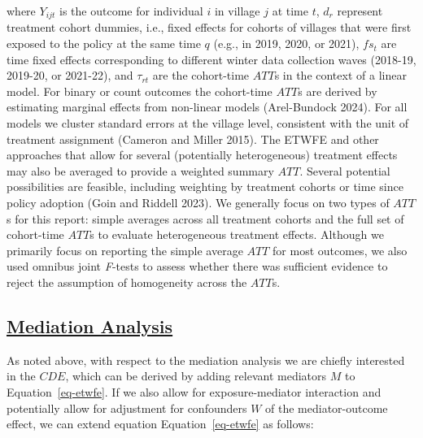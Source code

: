 \documentclass[
  letterpaper,
  DIV=11,
  numbers=noendperiod]{scrartcl}
\providecommand{\DIFadd}[1]{{\protect\color{blue}\underline{#1}}} %
\providecommand{\DIFaddbegin}{} %
\providecommand{\DIFaddend}{} %
\providecommand{\DIFdelbegin}{} %
\providecommand{\DIFdelend}{} %
\newcommand{\DIFscaledelfig}{0.5}
\newlength{\DIFdelgraphicswidth} %
\newlength{\DIFdelgraphicsheight} %
\newcommand{\DIFaddincludegraphics}[2][]{{\color{blue}\fbox{\DIFOincludegraphics[#1]{#2}}}} %
\newcommand{\DIFdelincludegraphics}[2][]{%
\sbox{\DIFdelgraphicsbox}{\DIFOincludegraphics[#1]{#2}}%
\settoboxwidth{\DIFdelgraphicswidth}{\DIFdelgraphicsbox} %
\settoboxtotalheight{\DIFdelgraphicsheight}{\DIFdelgraphicsbox} %
\scalebox{\DIFscaledelfig}{%
\parbox[b]{\DIFdelgraphicswidth}{\usebox{\DIFdelgraphicsbox}\\[-\baselineskip] \rule{\DIFdelgraphicswidth}{0em}}\llap{\resizebox{\DIFdelgraphicswidth}{\DIFdelgraphicsheight}{%
\setlength{\unitlength}{\DIFdelgraphicswidth}%
\begin{picture}(1,1)%
\thicklines\linethickness{2pt} %
{\color[rgb]{1,0,0}\put(0,0){\framebox(1,1){}}}%
{\color[rgb]{1,0,0}\put(0,0){\line( 1,1){1}}}%
{\color[rgb]{1,0,0}\put(0,1){\line(1,-1){1}}}%
\end{picture}%
}\hspace*{3pt}}} %
} %
\DeclareRobustCommand{\DIFaddbegin}{\DIFOaddbegin \let\includegraphics\DIFaddincludegraphics} %
\DeclareRobustCommand{\DIFaddend}{\DIFOaddend \let\includegraphics\DIFOincludegraphics} %
\DeclareRobustCommand{\DIFdelbegin}{\DIFOdelbegin \let\includegraphics\DIFdelincludegraphics} %
\DeclareRobustCommand{\DIFdelend}{\DIFOaddend \let\includegraphics\DIFOincludegraphics} %
\begin{document}
where \(Y_{ijt}\) is the outcome for individual \(i\) in village \(j\)
at time \(t\), \(d_{r}\) represent treatment cohort dummies, i.e., fixed
effects for cohorts of villages that were first exposed to the policy at
the same time \(q\) (e.g., in 2019, 2020, or 2021), \(fs_{t}\) are time
fixed effects corresponding to different winter data collection waves
(2018-19, 2019-20, or 2021-22), and \(\tau_{rt}\) are the cohort-time
\(ATT\)s in the context of a linear model. For binary or count outcomes
the cohort-time \(ATT\)s are derived by estimating marginal effects from
non-linear models (Arel-Bundock 2024). For all models we cluster
standard errors at the village level, consistent with the unit of
treatment assignment (Cameron and Miller 2015). The ETWFE and other
approaches that allow for several (potentially heterogeneous) treatment
effects may also be averaged to provide a weighted summary \(ATT\).
Several potential possibilities are feasible, including weighting by
treatment cohorts or time since policy adoption (Goin and Riddell 2023).
We generally focus on two types of \(ATT\)s for this report: simple
averages across all treatment cohorts and the full set of cohort-time
\(ATT\)s to evaluate heterogeneous treatment effects. Although we
primarily focus on reporting the simple average \(ATT\) for most
outcomes, we also used omnibus joint \emph{F}-tests to assess whether
there was sufficient evidence to reject the assumption of homogeneity
across the \(ATT\)s.

\DIFdelbegin %
\DIFdelend \DIFaddbegin \subsection{\DIFadd{Mediation Analysis}}\label{mediation-analysis}
\DIFaddend 

As noted above, with respect to the mediation analysis we are chiefly
interested in the \(CDE\), which can be derived by adding relevant
mediators \(M\) to Equation~\ref{eq-etwfe}. If we also allow for
exposure-mediator interaction and potentially allow for adjustment for
confounders \(W\) of the mediator-outcome effect, we can extend equation
Equation~\ref{eq-etwfe} as follows:
\end{document}
